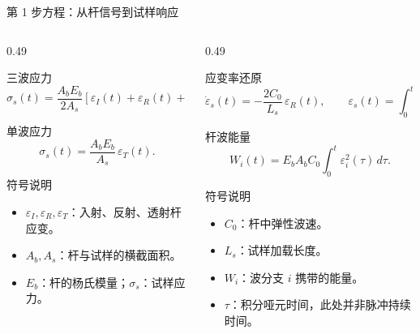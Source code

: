 \documentclass[11pt,aspectratio=169]{beamer}
\begin{document}
\begin{frame}{第 1 步方程：从杆信号到试样响应}
  \scriptsize
  \begin{columns}[T,onlytextwidth]
    \begin{column}{0.49\textwidth}
      \begin{block}{三波应力}
        \[
          \sigma_s(t)=
          \frac{A_bE_b}{2A_s}
          \left[\varepsilon_I(t)+\varepsilon_R(t)+\varepsilon_T(t)\right].
        \]
      \end{block}
      \begin{block}{单波应力}
        \[
          \sigma_s(t)=\frac{A_bE_b}{A_s}\,\varepsilon_T(t).
        \]
      \end{block}
      \begin{block}{符号说明}
        \begin{itemize}
          \item $\varepsilon_I,\varepsilon_R,\varepsilon_T$：入射、反射、透射杆应变。
          \item $A_b,A_s$：杆与试样的横截面积。
          \item $E_b$：杆的杨氏模量；$\sigma_s$：试样应力。
        \end{itemize}
      \end{block}
    \end{column}
    \begin{column}{0.49\textwidth}
      \begin{exampleblock}{应变率还原}
        \[
          \dot{\varepsilon}_s(t)=
          -\frac{2C_0}{L_s}\,\varepsilon_R(t),
          \qquad
          \varepsilon_s(t)=\int_0^t \dot{\varepsilon}_s(\tau)\,d\tau .
        \]
      \end{exampleblock}
      \begin{block}{杆波能量}
        \[
          W_i(t)=E_bA_bC_0
          \int_0^t \varepsilon_i^2(\tau)\,d\tau .
        \]
      \end{block}
      \begin{block}{符号说明}
        \begin{itemize}
          \item $C_0$：杆中弹性波速。
          \item $L_s$：试样加载长度。
          \item $W_i$：波分支 $i$ 携带的能量。
          \item $\tau$：积分哑元时间，此处并非脉冲持续时间。
        \end{itemize}
      \end{block}
    \end{column}
  \end{columns}
\end{frame}
\end{document}
